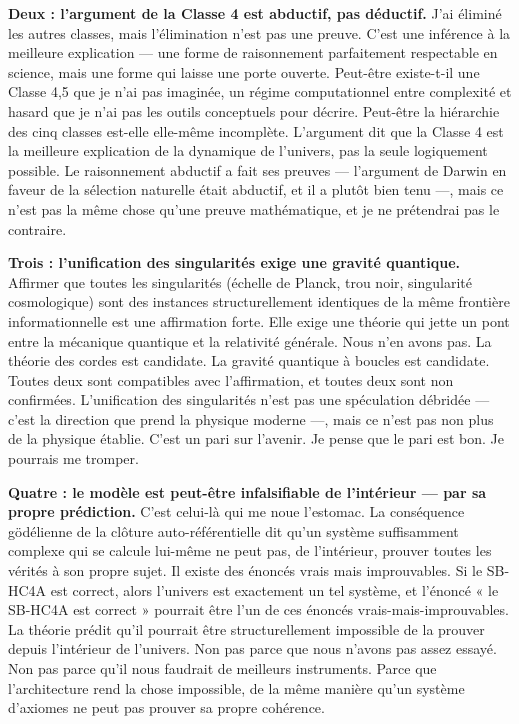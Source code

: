 \documentclass[11pt, twoside, openright]{book}
\begin{document}
\textbf{Deux : l'argument de la Classe 4 est abductif, pas déductif.} J'ai éliminé les autres classes, mais l'élimination n'est pas une preuve. C'est une inférence à la meilleure explication --- une forme de raisonnement parfaitement respectable en science, mais une forme qui laisse une porte ouverte. Peut-être existe-t-il une Classe 4,5 que je n'ai pas imaginée, un régime computationnel entre complexité et hasard que je n'ai pas les outils conceptuels pour décrire. Peut-être la hiérarchie des cinq classes est-elle elle-même incomplète. L'argument dit que la Classe 4 est la meilleure explication de la dynamique de l'univers, pas la seule logiquement possible. Le raisonnement abductif a fait ses preuves --- l'argument de Darwin en faveur de la sélection naturelle était abductif, et il a plutôt bien tenu ---, mais ce n'est pas la même chose qu'une preuve mathématique, et je ne prétendrai pas le contraire.

\textbf{Trois : l'unification des singularités exige une gravité quantique.} Affirmer que toutes les singularités (échelle de Planck, trou noir, singularité cosmologique) sont des instances structurellement identiques de la même frontière informationnelle est une affirmation forte. Elle exige une théorie qui jette un pont entre la mécanique quantique et la relativité générale. Nous n'en avons pas. La théorie des cordes est candidate. La gravité quantique à boucles est candidate. Toutes deux sont compatibles avec l'affirmation, et toutes deux sont non confirmées. L'unification des singularités n'est pas une spéculation débridée --- c'est la direction que prend la physique moderne ---, mais ce n'est pas non plus de la physique établie. C'est un pari sur l'avenir. Je pense que le pari est bon. Je pourrais me tromper.

\textbf{Quatre : le modèle est peut-être infalsifiable de l'intérieur --- par sa propre prédiction.} C'est celui-là qui me noue l'estomac. La conséquence gödélienne de la clôture auto-référentielle dit qu'un système suffisamment complexe qui se calcule lui-même ne peut pas, de l'intérieur, prouver toutes les vérités à son propre sujet. Il existe des énoncés vrais mais improuvables. Si le SB-HC4A est correct, alors l'univers est exactement un tel système, et l'énoncé « le SB-HC4A est correct » pourrait être l'un de ces énoncés vrais-mais-improuvables. La théorie prédit qu'il pourrait être structurellement impossible de la prouver depuis l'intérieur de l'univers. Non pas parce que nous n'avons pas assez essayé. Non pas parce qu'il nous faudrait de meilleurs instruments. Parce que l'architecture rend la chose impossible, de la même manière qu'un système d'axiomes ne peut pas prouver sa propre cohérence.
\end{document}
